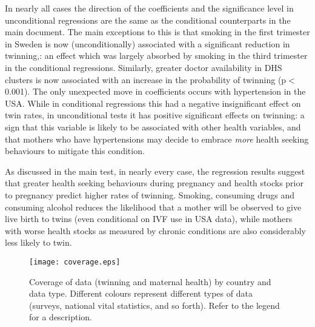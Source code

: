 \documentclass{nature}
\begin{document}
\begin{linenumbers}
In nearly all cases the direction of the coefficients and the significance level in unconditional regressions are the same as the conditional counterparts in the main document.  The main exceptions to this is that smoking in the first trimester in Sweden is now (unconditionally) associated with a significant reduction in twinning,: an effect which was largely absorbed by smoking in the third trimester in the conditional regressions.  Similarly, greater doctor availability in DHS clusters is now associated with an increase in the probability of twinning (p$<$0.001).  The only unexpected move in coefficients occurs with hypertension in the USA.  While in conditional regressions this had a negative insignificant effect on twin rates, in unconditional tests it has positive significant effects on twinning: a sign that this variable is likely to be associated with other health variables, and that mothers who have hypertensions may decide to embrace \emph{more} health seeking behaviours to mitigate this condition.

As discussed in the main test, in nearly every case, the regression results suggest that greater health seeking behaviours during pregnancy and health stocks prior to pregnancy predict higher rates of twinning.  Smoking, consuming drugs and consuming alcohol reduces the likelihood that a mother will be observed to give live birth to twins (even conditional on IVF use in USA data), while mothers with worse health stocks as measured by chronic conditions are also considerably less likely to twin.






\clearpage
\begin{spacing}{1}
\begin{figure}[ht!]
\texttt{[image: coverage.eps]}
\caption{Coverage of data (twinning and maternal health) by country and data type.  Different colours represent different types of data (surveys, national vital statistics, and so forth).  Refer to the legend for a description.}
\label{fig:twincoverage}
\end{figure}



\end{spacing}
\end{linenumbers}
\end{document}
